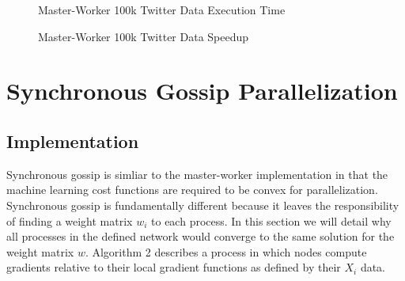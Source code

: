 \documentclass{article}
\theoremstyle{definition}
\begin{document}
{\begin{figure}[!ht]
    \centering
    \caption[]{Master-Worker 100k Twitter Data Execution Time}
    \label{100k}
\end{figure}

\begin{figure}[!ht]
    \centering
    \caption[]{Master-Worker 100k Twitter Data Speedup}
    \label{100k2}
\end{figure}
\section{Synchronous Gossip Parallelization}
\subsection{Implementation}
Synchronous gossip is simliar to the master-worker implementation in that the machine learning cost functions are required to be convex for parallelization. Synchronous gossip is fundamentally different because it leaves the responsibility of finding a weight matrix $w_i$ to each process. In this section we will detail why all processes in the defined network would converge to the same solution for the weight matrix $w$. Algorithm 2 describes a process in which nodes compute gradients relative to their local gradient functions as defined by their $X_i$ data.

}
\end{document}
